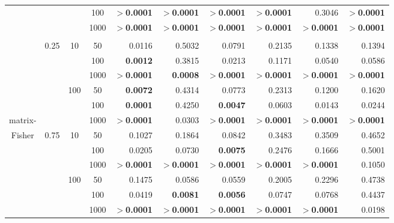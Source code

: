 \documentclass[12pt]{article}
\begin{document}
\begin{table}[h!]
\begin{center}
{\begin{tabular}{ccccrrrrrr}
  &  &  & 100 & $>$\textbf{0.0001} & $>$\textbf{0.0001} & $>$\textbf{0.0001} & $>$\textbf{0.0001} & 0.3046 & $>$\textbf{0.0001} \\ 
  &  &  & 1000 & $>$\textbf{0.0001} & $>$\textbf{0.0001} & $>$\textbf{0.0001} & $>$\textbf{0.0001} & $>$\textbf{0.0001} & $>$\textbf{0.0001} \\[5pt] \hline\\[-4pt]
  & \multirow{6}{*}{0.25} & \multirow{3}{*}{10} & 50 & 0.0116 & 0.5032 & 0.0791 & 0.2135 & 0.1338 & 0.1394 \\ 
  &  &  & 100 & \textbf{0.0012} & 0.3815 & 0.0213 & 0.1171 & 0.0540 & 0.0586 \\ 
  &  &  & 1000 & $>$\textbf{0.0001} & \textbf{0.0008} & $>$\textbf{0.0001} & $>$\textbf{0.0001} & $>$\textbf{0.0001} & $>$\textbf{0.0001} \\ \cline{3-10}
  &  & \multirow{3}{*}{100} & 50 & \textbf{0.0072} & 0.4314 & 0.0773 & 0.2313 & 0.1200 & 0.1620 \\ 
  &  &  & 100 & \textbf{0.0001} & 0.4250 & \textbf{0.0047} & 0.0603 & 0.0143 & 0.0244 \\ 
  matrix-&  &  & 1000 & $>$\textbf{0.0001} & 0.0303 & $>$\textbf{0.0001} & $>$\textbf{0.0001} & $>$\textbf{0.0001} & $>$\textbf{0.0001} \\ \cline{2-10}
  Fisher& \multirow{6}{*}{0.75} & \multirow{3}{*}{10} & 50 & 0.1027 & 0.1864 & 0.0842 & 0.3483 & 0.3509 & 0.4652 \\ 
  &  &  & 100 & 0.0205 & 0.0730 &\textbf{0.0075} & 0.2476 & 0.1666 & 0.5001 \\ 
  &  &  & 1000 & $>$\textbf{0.0001} & $>$\textbf{0.0001} & $>$\textbf{0.0001} & $>$\textbf{0.0001} & $>$\textbf{0.0001} & 0.1050 \\ \cline{3-10}
  &  & \multirow{3}{*}{100} & 50 & 0.1475 & 0.0586 & 0.0559 & 0.2005 & 0.2296 & 0.4738 \\ 
  &  &  & 100 & 0.0419 & \textbf{0.0081} & \textbf{0.0056} & 0.0747 & 0.0768 & 0.4437 \\ 
  &  &  & 1000 & $>$\textbf{0.0001} & $>$\textbf{0.0001} & $>$\textbf{0.0001} & $>$\textbf{0.0001} & $>$\textbf{0.0001} & 0.0198 \\ 
   \hline
\end{tabular}}
\end{center}
\end{table}
\end{document}
